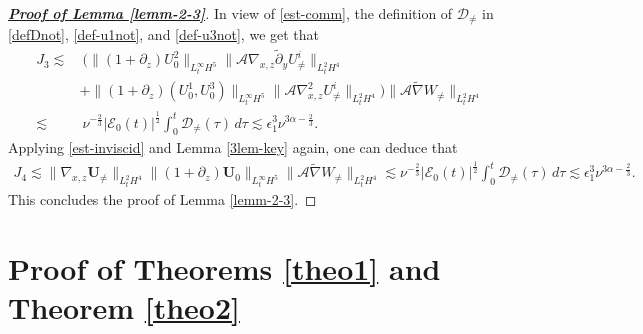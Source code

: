 \documentclass[11pt,reqno]{article}
\numberwithin{equation}{section}
\newcommand\R{{\mathbb R}}
\newcommand\T{{\mathbb T}}
\newcommand\D{{\mathcal D}}
\newcommand\E{{\mathcal E}}
\newcommand\A{\mathcal{A}}
\newcommand\U{\bm{U}}
\let\pa=\partial
\let\al=\alpha
\let\f=\frac
\let\ep=\epsilon
\begin{document}
\begin{proof}[\underline{\textbf{Proof of Lemma \ref{lemm-2-3}}}]
In view of \eqref{est-comm}, the definition of $\D_{\neq}$ in \eqref{defDnot}, \eqref{def-u1not}, and \eqref{def-u3not}, we get that
\begin{align*}
	J_3
	\lesssim& ~
	\big(\|(1+\pa_z)U^2_{0}\|_{L^\infty_tH^5}\|\A\nabla_{x,z}\tilde{\pa}_yU^i_{\not=}\|_{L^2_tH^4}
	\\
	&
	+
	\|(1+\pa_z)(U_0^1,U^3_{0})\|_{L^\infty_tH^5}\|\A\nabla_{x,z}^2U^i_{\not=}\|_{L^2_tH^4}\big)
	\|\A\widetilde{\nabla}W_{\not=}\|_{L^2_tH^4}
	\\
	\lesssim&~ \nu^{-\f23}|\E_{0}(t)|^{\f12}\int_0^t\D_{\not=}(\tau)\,d\tau
	\lesssim \ep_1^3\nu^{3\al-\f23}.
\end{align*}
Applying \eqref{est-inviscid} and Lemma \ref{3lem-key} again, one can deduce that
\begin{align*}
	J_4
	\lesssim 
	\|\nabla_{x,z}\U_{\not=}\|_{L^2_tH^4}\|(1+\pa_{z}) \U_0\|_{L^\infty_tH^5}\|\A\widetilde{\nabla}W_{\not=}\|_{L^2_tH^4}
	\lesssim \nu^{-\f23}|\E_{0}(t)|^{\f12}\int_0^t\D_{\not=}(\tau)\,d\tau
	\lesssim \ep_1^3\nu^{3\al-\f23}.
\end{align*}
This concludes the proof of Lemma \ref{lemm-2-3}.

\end{proof}










\section{Proof of  Theorems \ref{theo1} and Theorem \ref{theo2}}\label{sec5:proof-TRR}





\end{document}
